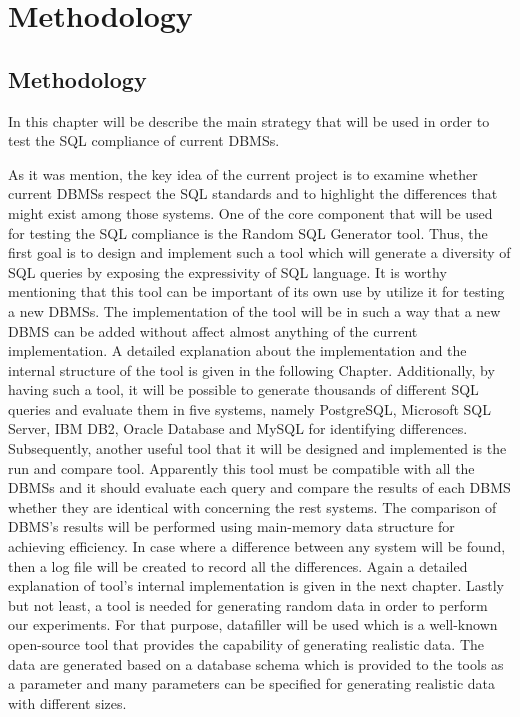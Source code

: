 
\chapter{Methodology}

\section{Methodology}
 
In this chapter will be describe the main strategy that will be used in order to test the SQL compliance of current DBMSs. 

 As it was mention, the key idea of the current project is to examine whether current DBMSs respect the SQL standards and to highlight the differences that might exist among those systems. One of the core component that will be used  for testing the SQL compliance is the Random SQL Generator tool. Thus, the first goal is to design and implement such a tool which will generate a diversity of SQL queries by exposing the expressivity of SQL language. It is worthy mentioning that this tool can be important of its own use by utilize it for testing a new DBMSs. The implementation of the tool will be in such a way that a new DBMS can be added without affect almost anything of the current implementation. A detailed explanation about the implementation and the internal structure of the tool is given in the following Chapter. Additionally, by having such a tool, it will be possible to generate thousands of different SQL queries and evaluate them in five systems, namely PostgreSQL, Microsoft SQL Server, IBM DB2, Oracle Database and MySQL for identifying differences. 
Subsequently, another useful tool that it will be designed and implemented is the run and compare tool. Apparently this tool must be compatible with all the DBMSs and it should evaluate each query and compare the results of each DBMS whether they are identical with concerning the rest systems. The comparison of DBMS’s results will be performed using main-memory data structure for achieving efficiency. In case where a difference between any system will be found, then a log file will be created to record all the differences. Again a detailed explanation of tool’s internal implementation is given in the next chapter.
Lastly but not least, a tool is needed for generating random data in order to perform our experiments. For that purpose, datafiller will be used which is a well-known open-source tool that provides the capability of generating realistic data. The data are generated based on a database schema which is provided to the tools as a parameter and many parameters can be specified for generating realistic data with different sizes. 







 